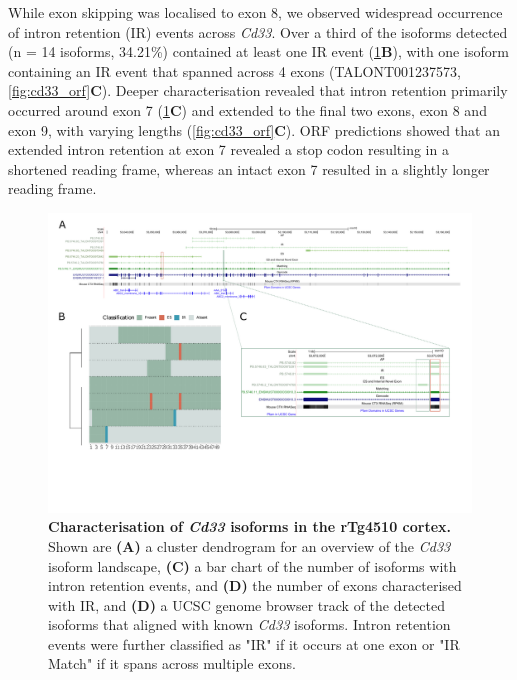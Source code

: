 While exon skipping was localised to exon 8, we observed widespread occurrence of intron retention (IR) events across \textit{Cd33}. Over a third of the isoforms detected (n = 14 isoforms, 34.21\%) contained at least one IR event (\cref{fig:cd33}\textbf{B}), with one isoform containing an IR event that spanned across 4 exons (TALONT001237573, \cref{fig:cd33_orf}\textbf{C}). Deeper characterisation revealed that intron retention primarily occurred around exon 7 (\cref{fig:cd33}\textbf{C}) and extended to the final two exons, exon 8 and exon 9, with varying lengths (\cref{fig:cd33_orf}\textbf{C}). ORF predictions showed that an extended intron retention at exon 7 revealed a stop codon resulting in a shortened reading frame, whereas an intact exon 7 resulted in a slightly longer reading frame.

\begin{landscape}
	\begin{figure}[htp]
		\centering
		\captionsetup{width=1.3\textwidth}
		\includegraphics[page=4,trim={0 3cm 0 0},scale = 0.85]{Figures/TargetGenes_Annotation_Landscape.pdf}
		\caption[Characterisation of the \textit{Cd33} isoform landscape]%
		{\textbf{Characterisation of \textit{Cd33} isoforms in the rTg4510 cortex.} Shown are \textbf{(A)} a cluster dendrogram for an overview of the \textit{Cd33} isoform landscape, \textbf{(C)} a bar chart of the number of isoforms with intron retention events, and \textbf{(D)} the number of exons characterised with IR, and \textbf{(D)} a UCSC genome browser track of the detected isoforms that aligned with known \textit{Cd33} isoforms. Intron retention events were further classified as "IR" if it occurs at one exon or "IR Match" if it spans across multiple exons.}    
		\label{fig:cd33}
	\end{figure}
\end{landscape}

